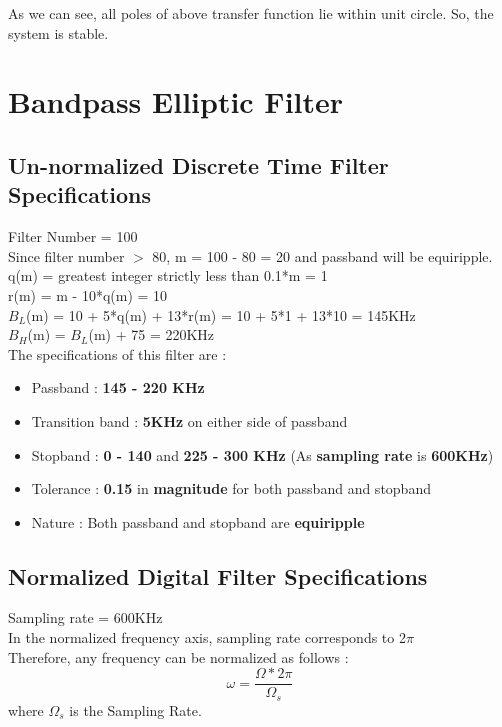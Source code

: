 \documentclass{article}
\begin{document}
As we can see, all poles of above transfer function lie within unit circle. So, the system is stable.
\newpage
\section{\textbf{Bandpass Elliptic Filter}}
\subsection{\textbf{Un-normalized Discrete Time Filter Specifications}}
Filter Number = 100\\
Since filter number $>$ 80, m = 100 - 80 = 20 and passband will be equiripple.\\
q(m) = greatest integer strictly less than 0.1*m = 1\\
r(m) = m - 10*q(m) = 10\\
$B_L$(m) = 10 + 5*q(m) + 13*r(m) = 10 + 5*1 + 13*10 = 145KHz \\
$B_H$(m) = $B_L$(m) + 75 = 220KHz\\

\vspace{1.5em}
\noindent
The specifications of this filter are :
\begin{itemize}
    \item Passband : \textbf{145 - 220 KHz}
    \item  Transition band : \textbf{5KHz} on either side of passband
    \item Stopband : \textbf{0 - 140}  and  \textbf{225 - 300 KHz} (As \textbf{sampling rate} is \textbf{600KHz})

    \item  Tolerance : \textbf{0.15} in \textbf{magnitude} for both passband and stopband
    \item  Nature : Both passband and stopband are \textbf{equiripple}
\end{itemize}


\subsection{Normalized Digital Filter Specifications}
Sampling rate = 600KHz\\
In the normalized frequency axis, sampling rate corresponds to 2$\pi$\\

Therefore, any frequency can be normalized as follows :
\begin{equation*}
    \omega = \frac{\Omega*2\pi}{\Omega_s}
\end{equation*}
where $\Omega_s$ is the Sampling Rate.\\
\end{document}
